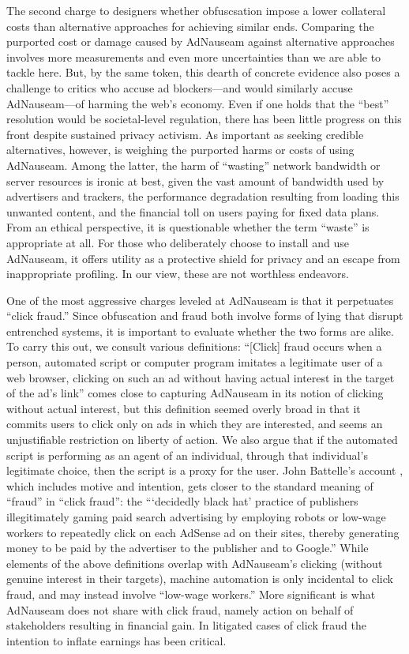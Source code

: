 \documentclass[conference]{IEEEtran}
\begin{document}
The second charge to designers whether obfuscsation impose a lower collateral costs than alternative approaches for achieving similar ends. Comparing the purported cost or damage caused by AdNauseam against alternative approaches involves more measurements and even more uncertainties than we are able to tackle here. But, by the same token, this dearth of concrete evidence also poses a challenge to critics who accuse ad blockers---and would similarly accuse AdNauseam---of harming the web's economy. Even if one holds that the “best” resolution would be societal-level regulation, there has been little progress on this front despite sustained privacy activism. As important as seeking credible alternatives, however, is weighing the purported harms or costs of using AdNauseam. Among the latter, the harm of “wasting” network bandwidth or server resources is ironic at best, given the vast amount of bandwidth used by advertisers and trackers, the performance degradation resulting from loading this unwanted content, and the financial toll on users paying for fixed data plans. From an ethical perspective, it is questionable whether the term “waste” is appropriate at all. For those who deliberately choose to install and use AdNauseam, it offers utility as a protective shield for privacy and an escape from inappropriate profiling. In our view, these are not worthless endeavors.

One of the most aggressive charges leveled at AdNauseam is that it perpetuates “click fraud.” Since obfuscation and fraud both involve forms of lying that disrupt entrenched systems, it is important to evaluate whether the two forms are alike. To carry this out, we consult various definitions: “[Click] fraud occurs when a person, automated script or computer program imitates a legitimate user of a web browser, clicking on such an ad without having actual interest in the target of the ad's link” \cite{Liu} comes close to capturing AdNauseam in its notion of clicking without actual interest, but this definition seemed overly broad in that it commits users to click only on ads in which they are interested, and seems an unjustifiable restriction on liberty of action. We also argue that if the automated script is performing as an agent of an individual, through that individual's legitimate choice, then the script is a proxy for the user. John Battelle's account \cite{Battelle}, which includes motive and intention, gets closer to the standard meaning of “fraud” in “click fraud”: the “‘decidedly black hat’ practice of publishers illegitimately gaming paid search advertising by employing robots or low-wage workers to repeatedly click on each AdSense ad on their sites, thereby generating money to be paid by the advertiser to the publisher and to Google.” While elements of the above definitions overlap with AdNauseam's clicking (without genuine interest in their targets), machine automation is only incidental to click fraud, and may instead involve “low-wage workers.” More significant is what AdNauseam does not share with click fraud, namely action on behalf of stakeholders resulting in financial gain. In litigated cases of click fraud the intention to inflate earnings has been critical.
\end{document}
